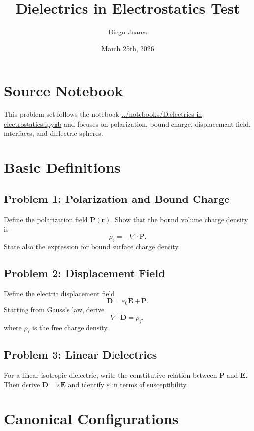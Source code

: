 \documentclass[hidelinks]{article}
\title{\textbf{Dielectrics in Electrostatics Test}}
\author{Diego Juarez}
\date{March 25th, 2026}
\begin{document}
\hypersetup{bookmarksnumbered=true}
\pagecolor{black}
\color{white}
\maketitle

\begin{Large}
\tableofcontents
\end{Large}
\pagebreak

\section{Source Notebook}
This problem set follows the notebook
\url{../notebooks/Dielectrics in electrostatics.ipynb}
and focuses on polarization, bound charge, displacement field, interfaces, and dielectric spheres.

\section{Basic Definitions}
\subsection{Problem 1: Polarization and Bound Charge}
Define the polarization field $\mathbf{P}(\mathbf{r})$. Show that the bound volume charge density is
\[
\rho_b=-\nabla\cdot \mathbf{P}.
\]
State also the expression for bound surface charge density.

\subsection{Problem 2: Displacement Field}
Define the electric displacement field
\[
\mathbf{D}=\varepsilon_0\mathbf{E}+\mathbf{P}.
\]
Starting from Gauss's law, derive
\[
\nabla\cdot \mathbf{D}=\rho_f,
\]
where $\rho_f$ is the free charge density.

\subsection{Problem 3: Linear Dielectrics}
For a linear isotropic dielectric, write the constitutive relation between $\mathbf{P}$ and $\mathbf{E}$. Then derive $\mathbf{D}=\varepsilon \mathbf{E}$ and identify $\varepsilon$ in terms of susceptibility.

\section{Canonical Configurations}
\end{document}
